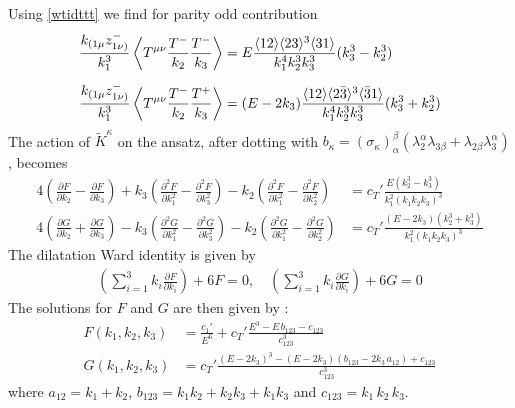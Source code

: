 \documentclass[a4paper,11pt]{article}
\begin{document}
Using \eqref{wtidttt} we find for parity odd contribution
\begin{align}\label{WTTT}
    \frac{k_{(1\mu}z_{1\nu)}^-}{k_1^3}\left\langle T^{\mu\nu} \frac{T^-}{k_2} \frac{T^-}{k_3} \right\rangle&= E \frac{\langle 12 \rangle \langle 23 \rangle^3\langle 31 \rangle}{k_1^4k_2^3k_3^3}(k_3^3-k_2^3)\notag \\[5 pt]
      \frac{k_{(1\mu}z_{1\nu)}^-}{k_1^3}\left\langle T^{\mu\nu} \frac{T^-}{k_2} \frac{T^+}{k_3} \right\rangle&= (E-2k_3) \frac{\langle 12 \rangle \langle 2\bar{3} \rangle^3\langle \bar{3}1 \rangle}{k_1^4k_2^3k_3^3}(k_3^3+k_2^3)
\end{align}
The action of $\widetilde{K}^{\kappa}$ on the ansatz, after dotting with $b_{\kappa}=(\sigma_{\kappa})_{\alpha}^{\beta}(\lambda_2^{\alpha}\lambda_{3\beta}+\lambda_{2\beta}\lambda_3^{\alpha})$, becomes
\begin{align}
4\left(\frac{\partial F}{\partial k_2}-\frac{\partial F}{\partial k_3}\right)+k_3\left(\frac{\partial^2 F}{\partial k_1^2}-\frac{\partial^2 F}{\partial k_3^2}\right)-k_2\left(\frac{\partial^2 F}{\partial k_1^2}-\frac{\partial^2 F}{\partial k_2^2}\right)&= c_T'\frac{E (k_2^3-k_3^3)}{k_1^2(k_1 k_2 k_3)^3}\\[5 pt]
4\left(\frac{\partial G}{\partial k_2}+\frac{\partial G}{\partial k_3}\right)-k_3\left(\frac{\partial^2 G}{\partial k_1^2}-\frac{\partial^2 G}{\partial k_3^2}\right)-k_2\left(\frac{\partial^2 G}{\partial k_1^2}-\frac{\partial^2 G}{\partial k_2^2}\right)&= c_T'\frac{(E-2k_3) (k_2^3+k_3^3)}{k_1^2(k_1 k_2 k_3)^3}
\end{align}
The dilatation Ward identity is given by
\begin{align}
\left(\sum_{i=1}^3 k_i \frac{\partial F}{\partial k_i}\right)+6F=0,\quad
\left(\sum_{i=1}^3 k_i \frac{\partial G}{\partial k_i}\right)+6G=0
\end{align}
The solutions for $F$ and $G$ are then given by :
\begin{align}
\label{tttsh}
F(k_1, k_2, k_3) &= \frac{c_1'}{E^6}+c_T'\frac{E^3-E\,b_{123}-c_{123}}{c_{123}^3}\\[5 pt]
G(k_1, k_2, k_3) &= c_T'\frac{(E-2k_3)^3-(E-2k_3)(b_{123}-2k_3\,a_{12})+c_{123}}{c_{123}^3}
\end{align}
where  $a_{12}=k_1+k_2$, $b_{123}=k_1k_2+k_2k_3+k_1k_3$ and $c_{123}=k_1\,k_2\,k_3$.
\end{document}
